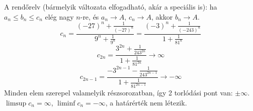 \documentclass[11pt]{scrartcl}
\begin{document}
A rendőrelv (bármelyik változata elfogadható, akár a speciális is): ha
$a_n \le b_n \le c_n$ elég nagy $n$-re, és $a_n \to A$, $c_n \to A$, akkor
$b_n \to A$.
\[
	c_n
	= \frac{(-27)^n + \frac{1}{(-27)^n}}{9^n + \frac{1}{9^n}}
	= \frac{(-3)^n + \frac{1}{(-243)^n}}{1 + \frac{1}{81^n}}
\]
\[
	c_{2n}
	= \frac{3^{2n} + \frac{1}{243^{2n}}}{1 + \frac{1}{81^{2n}}}
	\to \infty
\]
\[
	c_{2n - 1}
	= \frac{-3^{2n - 1} - \frac{1}{243^{2n - 1}}}{1 + \frac{1}{81^{2n - 1}}}
	\to -\infty
\]
Minden elem szerepel valamelyik részsorozatban, így 2 torlódási pont van:
$\pm \infty$. $\limsup c_n = \infty$, $\liminf c_n = -\infty$, a határérték
nem létezik.
\end{document}
